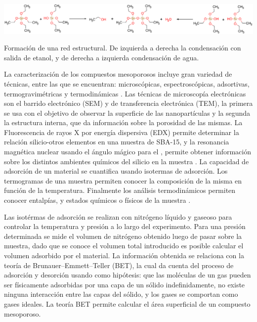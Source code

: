 \documentclass[fleqn,11pt]{SelfArx}
\begin{document}
	\begin{scheme*}[ht]
		\centering
		\includegraphics[width=\linewidth]{structures/polysilicate.png}
		\caption{Formaci\'on de una red estructural. De izquierda a derecha la condensaci\'on con salida de etanol, y de derecha a izquierda condensaci\'on de agua.}
		\label{sch: polysilicate}
	\end{scheme*}
	
	La caracterizaci\'on de los compuestos mesoporosos incluye gran variedad de t\'ecnicas, entre las que se encuentran: microsc\'opicas, espectrosc\'opicas, adsortivas, termogravim\'etricas y termodin\'amicas \cite{vargas_legnoverde_giraldo_basaldella_moreno-pirajan_2010}. Las t\'ecnicas de microscop\'ia electr\'onicas son el barrido electr\'onico (SEM) y de transferencia electr\'onica (TEM), la primera se usa con el objetivo de observar la superficie de las nanopart\'iculas y la segunda la estructura interna, que da informaci\'on sobre la porosidad de las mismas. La Fluorescencia de rayos X por energía dispersiva (EDX) permite determinar la relaci\'on silicio-otros elementos en una muestra de SBA-15, y la resonancia magn\'etica nuclear usando el \'angulo m\'agico para el , permite obtener informaci\'on sobre los distintos ambientes qu\'imicos del silicio en la muestra \cite{zhao_1998}. La capacidad de adsorci\'on de un material se cuantifica usando isotermas de adsorci\'on. Los termogramas de una muestra permiten conocer la composici\'on de la misma en funci\'on de la temperatura. Finalmente los an\'alisis termodin\'amicos permiten conocer entalp\'ias, y estados qu\'imicos o f\'isicos de la muestra \cite{vargas_legnoverde_giraldo_basaldella_moreno-pirajan_2010}.
	
	Las isot\'ermas de adsorci\'on se realizan con nitr\'ogeno l\'iquido y gaseoso para controlar la temperatura y presi\'on a lo largo del experimento. Para una presi\'on determinada se mide el volumen de nitr\'ogeno obtenido luego de pasar sobre la muestra, dado que se conoce el volumen total introducido es posible calcular el volumen adsorbido por el material. La informaci\'on obtenida se relaciona con la teor\'ia de Brunauer–Emmett–Teller (BET), la cual da cuenta del proceso de adsorci\'on y desorci\'on usando como hip\'otesis: que las mol\'eculas de un gas pueden ser f\'isicamente adsorbidas por una capa de un s\'olido indefinidamente, no existe ninguna interacci\'on entre las capas del s\'olido, y los gases se comportan como gases ideales. La teor\'ia BET permite calcular el \'area superficial de un compuesto mesoporoso.
	
\end{document}
